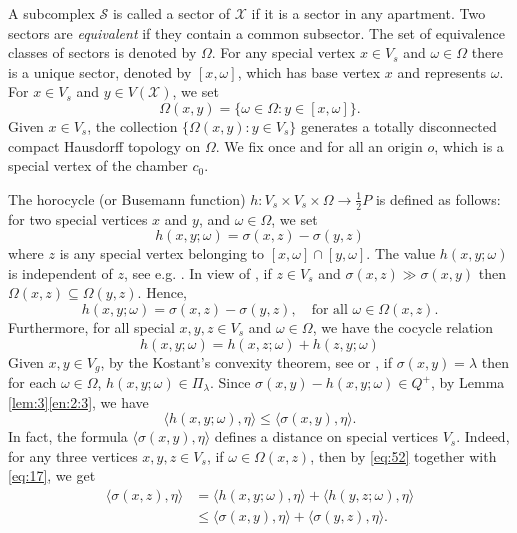 \documentclass[11pt]{amsart}
\newcommand{\scrX}{\mathscr{X}}
\newcommand{\scrS}{\mathscr{S}}
\newcommand{\sprod}[2]{\langle {#1}, {#2} \rangle}
\theoremstyle{plain}
\theoremstyle{definition}
\numberwithin{equation}{section}
\begin{document}
A subcomplex $\scrS$ is called a sector of $\scrX$ if it is a sector in any apartment. Two sectors are \emph{equivalent} if 
they contain a common subsector. The set of equivalence classes of sectors is denoted by $\Omega$. For any special vertex
$x \in V_s$ and $\omega \in \Omega$ there is a unique sector, denoted by $[x, \omega]$, which has base vertex $x$ and represents 
$\omega$. For $x \in V_s$ and $y \in V(\scrX)$, we set
\[
	\Omega(x, y) = \big\{\omega \in \Omega : y \in [x, \omega]\big\}.
\]
Given $x \in V_s$, the collection $\{\Omega(x, y) : y \in V_s\}$ generates a totally disconnected compact Hausdorff topology
on $\Omega$. We fix once and for all an origin $o$, which is a special vertex of the chamber $c_0$.

The horocycle (or Busemann function) $h: V_s \times V_s \times \Omega \rightarrow \tfrac{1}{2} P$ is defined as follows: for 
two special vertices $x$ and $y$, and $\omega \in \Omega$, we set
\[
	h(x, y; \omega) = \sigma(x, z) - \sigma(y, z)
\]
where $z$ is any special vertex belonging to $[x, \omega] \cap [y, \omega]$. The value $h(x, y; \omega)$ is independent of $z$,
see e.g. \cite[Proposition 3.3]{mz1}. In view of \cite[Lemma 3.13]{park2}, if $z \in V_s$ and 
$\sigma(x, z) \gg \sigma(x, y)$ then $\Omega(x, z) \subseteq \Omega(y, z)$. Hence,
\begin{equation}
	\label{eq:4}
	h(x, y; \omega) = \sigma(x, z) - \sigma(y, z), \quad \text{for all } \omega \in \Omega(x, z).
\end{equation}
Furthermore, for all special $x, y, z \in V_s$ and $\omega \in \Omega$, we have the cocycle relation
\begin{equation}
	\label{eq:52}
	h(x, y; \omega) = h(x, z; \omega) + h(z, y; \omega)
\end{equation}
Given $x, y \in V_g$, by the Kostant's convexity theorem, see \cite{Kostant} or \cite[Lemma 3.19]{park2}, if 
$\sigma(x, y) = \lambda$ then for each $\omega \in \Omega$, $h(x, y; \omega) \in \Pi_\lambda$. Since 
$\sigma(x, y) - h(x, y; \omega) \in Q^+$, by Lemma \ref{lem:3}\eqref{en:2:3}, we have
\begin{equation}
	\label{eq:17}
	\sprod{h(x, y; \omega)}{\eta} 
	\leqslant \sprod{\sigma(x, y)}{\eta}.
\end{equation}
In fact, the formula $\sprod{\sigma(x, y)}{\eta}$ defines a distance on special vertices $V_s$. Indeed, for any three vertices 
$x, y, z \in V_s$, if $\omega \in \Omega(x, z)$, then by \eqref{eq:52} together with \eqref{eq:17}, we get
\begin{align}
	\nonumber
	\sprod{\sigma(x, z)}{\eta}
	&= \sprod{h(x, y; \omega)}{\eta} + \sprod{h(y, z; \omega)}{\eta} \\
	\label{eq:12}
	&\leqslant \sprod{\sigma(x, y)}{\eta} + \sprod{\sigma(y, z)}{\eta}.
\end{align}
\end{document}
